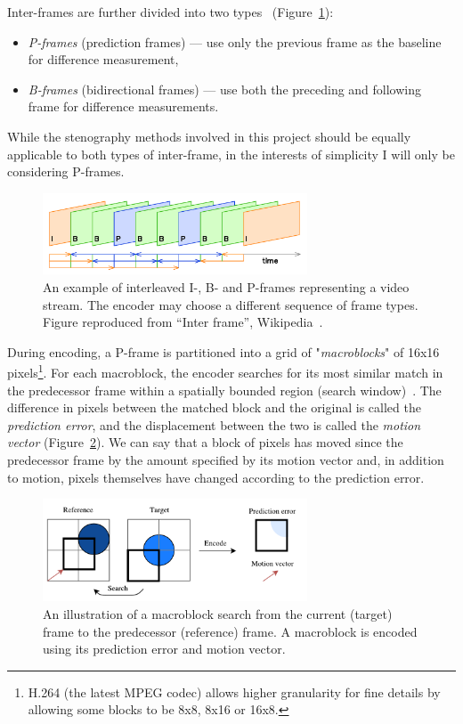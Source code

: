 \documentclass[12pt,british,twoside,notitlepage,usenames,dvipsnames,hypens,final]{report}
\numberwithin{equation}{section}
\numberwithin{figure}{section}
\begin{document}
Inter-frames are further divided into two types~\cite{crowcroft1999internetworking} (Figure~\ref{fig:ipb-seq}):
\begin{itemize}
\item \emph{P-frames} (prediction frames) --- use only the previous frame as the baseline for difference measurement,
\item \emph{B-frames} (bidirectional frames) --- use both the preceding and following frame for difference measurements. 
\end{itemize}

While the stenography methods involved in this project should be equally applicable to both types of inter-frame, in the interests of simplicity I will only be considering P-frames.

\begin{figure}[tbh]
\centerline{\includegraphics[width=0.7\textwidth, height=0.7\textheight, keepaspectratio]{img/IPB_images_sequence.png}}
\caption{An example of interleaved I-, B- and P-frames representing a video stream. The encoder may choose a different sequence of frame types. Figure reproduced from ``Inter frame'', Wikipedia~\cite{interframe-wiki}.}
\label{fig:ipb-seq}
\end{figure}

During encoding, a P-frame is partitioned into a grid of "\emph{macroblocks}" of 16x16 pixels\footnote{H.264 (the latest MPEG codec) allows higher granularity for fine details by allowing some blocks to be 8x8, 8x16 or 16x8.}. For each macroblock, the encoder searches for its most similar match in the predecessor frame within a spatially bounded region (search window)~\cite[p.~256]{richardson2004h}. The difference in pixels between the matched block and the original is called the \emph{prediction error}, and the displacement between the two is called the \emph{motion vector} (Figure~\ref{fig:mb-search}). We can say that a block of pixels has moved since the predecessor frame by the amount specified by its motion vector and, in addition to motion, pixels themselves have changed according to the prediction error.

\begin{figure}[tbh]
\centerline{\includegraphics[width=0.7\textwidth,height=0.7\textheight,keepaspectratio]
{img/macroblock-diagram.pdf}}
\caption{An illustration of a macroblock search from the current (target) frame to the predecessor (reference) frame. A macroblock is encoded using its prediction error and  motion vector.}
\label{fig:mb-search}
\end{figure} 
\end{document}
